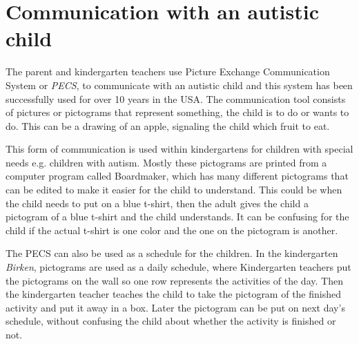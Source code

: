 \section{Communication with an autistic child}
The parent and kindergarten teachers use Picture Exchange Communication System or \textit{PECS}, to communicate with an autistic child and this system has been successfully used for over 10 years in the USA\cite{centerAutism}. The communication tool consists of pictures or pictograms that represent something, the child is to do or wants to do. This can be a drawing of an apple, signaling the child which fruit to eat. 

This form of communication is used within kindergartens for children with special needs e.g. children with autism. Mostly these pictograms are printed from a computer program called Boardmaker, which has many different pictograms that can be edited to make it easier for the child to understand. This could be when the child needs to put on a blue t-shirt, then the adult gives the child a pictogram of a blue t-shirt and the child understands. It can be confusing for the child if the actual t-shirt is one color and the one on the pictogram is another.

The PECS can also be used as a schedule for the children. In the kindergarten \textit{Birken}, pictograms are used as a daily schedule, where Kindergarten teachers put the pictograms on the wall so one row represents the activities of the day. Then the kindergarten teacher teaches the child to take the pictogram of the finished activity and put it away in a box. Later the pictogram can be put on next day's schedule, without confusing the child about whether the activity is finished or not.

